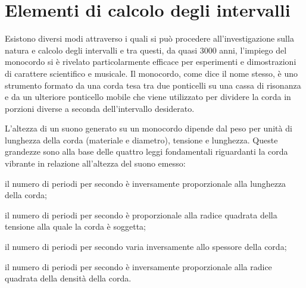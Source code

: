 \chapter{Elementi di calcolo degli intervalli}

Esistono diversi modi attraverso i quali si può procedere all'investigazione
sulla natura e calcolo degli intervalli e tra questi, da quasi 3000 anni,
l'impiego del monocordo si è rivelato particolarmente efficace per esperimenti
e dimostrazioni di carattere scientifico e musicale. Il monocordo, come dice il
nome stesso, è uno strumento formato da una corda tesa tra due ponticelli su
una cassa di risonanza e da un ulteriore ponticello mobile che viene utilizzato
per dividere la corda in porzioni diverse a seconda dell'intervallo desiderato.

L'altezza di un suono generato su un monocordo dipende dal peso per unità di
lunghezza della corda (materiale e diametro), tensione e lunghezza. Queste
grandezze sono alla base delle quattro leggi fondamentali riguardanti la corda
vibrante in relazione all'altezza del suono emesso:

\begin{elenco}
  \item il numero di periodi per secondo è inversamente proporzionale alla
        lunghezza della corda;
  \item il numero di periodi per secondo è proporzionale alla radice quadrata
        della tensione alla quale la corda è soggetta;
  \item il numero di periodi per secondo varia inversamente allo spessore della
        corda;
  \item il numero di periodi per secondo è inversamente proporzionale alla
        radice quadrata della densità della corda.
\end{elenco}


